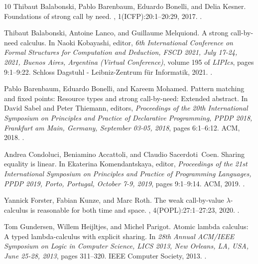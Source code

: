 \begin{thebibliography}{10}
Thibaut Balabonski, Pablo Barenbaum, Eduardo Bonelli, and Delia Kesner.
\newblock Foundations of strong call by need.
, 1({ICFP}):20:1--20:29, 2017.
\newblock \href {https://doi.org/10.1145/3110264} {}.

Thibaut Balabonski, Antoine Lanco, and Guillaume Melquiond.
\newblock A strong call-by-need calculus.
\newblock In Naoki Kobayashi, editor, {\em 6th International Conference on
  Formal Structures for Computation and Deduction, {FSCD} 2021, July 17-24,
  2021, Buenos Aires, Argentina (Virtual Conference)}, volume 195 of {\em
  LIPIcs}, pages 9:1--9:22. Schloss Dagstuhl - Leibniz-Zentrum f{\"{u}}r
  Informatik, 2021.
\newblock \href {https://doi.org/10.4230/LIPICS.FSCD.2021.9}
  {}.

Pablo Barenbaum, Eduardo Bonelli, and Kareem Mohamed.
\newblock Pattern matching and fixed points: Resource types and strong
  call-by-need: Extended abstract.
\newblock In David Sabel and Peter Thiemann, editors, {\em Proceedings of the
  20th International Symposium on Principles and Practice of Declarative
  Programming, {PPDP} 2018, Frankfurt am Main, Germany, September 03-05, 2018},
  pages 6:1--6:12. {ACM}, 2018.
\newblock \href {https://doi.org/10.1145/3236950.3236972}
  {}.

Andrea Condoluci, Beniamino Accattoli, and Claudio Sacerdoti~Coen.
\newblock Sharing equality is linear.
\newblock In Ekaterina Komendantskaya, editor, {\em Proceedings of the 21st
  International Symposium on Principles and Practice of Programming Languages,
  { PPDP} 2019, Porto, Portugal, October 7-9, 2019}, pages 9:1--9:14. {ACM},
  2019.
\newblock \href {https://doi.org/10.1145/3354166.3354174}
  {}.

Yannick Forster, Fabian Kunze, and Marc Roth.
\newblock The weak call-by-value {\(\lambda\)}-calculus is reasonable for both
  time and space.
, 4({POPL}):27:1--27:23, 2020.
\newblock \href {https://doi.org/10.1145/3371095} {}.

Tom Gundersen, Willem Heijltjes, and Michel Parigot.
\newblock Atomic lambda calculus: {A} typed lambda-calculus with explicit
  sharing.
\newblock In {\em 28th Annual {ACM/IEEE} Symposium on Logic in Computer
  Science, {LICS} 2013, New Orleans, LA, USA, June 25-28, 2013}, pages
  311--320. {IEEE} Computer Society, 2013.
\newblock \href {https://doi.org/10.1109/LICS.2013.37}
  {}.


\end{thebibliography}
